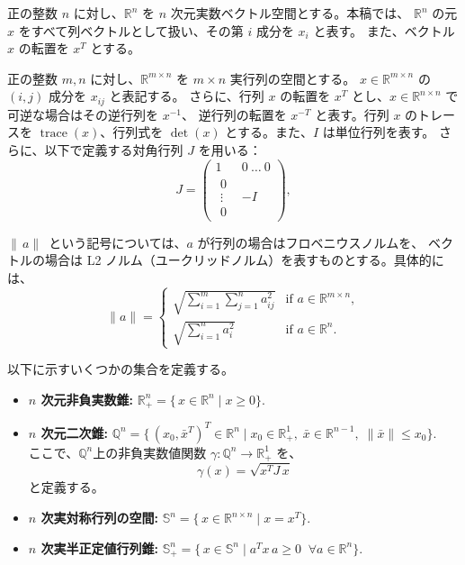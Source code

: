 \documentclass{jsarticle}
\begin{document}
正の整数 $n$ に対し、$\mathbb{R}^n$ を $n$ 次元実数ベクトル空間とする。本稿では、
$\mathbb{R}^n$ の元 $x$ をすべて列ベクトルとして扱い、その第 $i$ 成分を $x_i$ と表す。
また、ベクトル $x$ の転置を $x^T$ とする。

正の整数 $m, n$ に対し、$\mathbb{R}^{m\times n}$ を $m\times n$ 実行列の空間とする。
$x\in\mathbb{R}^{m\times n}$ の $(i,j)$ 成分を $x_{ij}$ と表記する。
さらに、行列 $x$ の転置を $x^T$ とし、$x \in \mathbb{R}^{n\times n}$ で可逆な場合はその逆行列を $x^{-1}$、
逆行列の転置を $x^{-T}$ と表す。行列 $x$ のトレースを $\operatorname{trace}(x)$、行列式を
$\operatorname{det}(x)$ とする。また、$I$ は単位行列を表す。
さらに、以下で定義する対角行列 $J$ を用いる：
\[
    J = \begin{pmatrix}
         1 & 0 ~\ldots ~0 \\
         \substack{\displaystyle 0 \\ \displaystyle \vdots \\ \displaystyle 0} & -I
    \end{pmatrix},
\]

$\|\,a\|\,$ という記号については、$a$ が行列の場合はフロベニウスノルムを、
ベクトルの場合は L2 ノルム（ユークリッドノルム）を表すものとする。具体的には、
\[
\|a\| = 
\begin{cases}
    \sqrt{\sum_{i=1}^m \sum_{j=1}^n a_{ij}^2} & \text{if } a \in \mathbb{R}^{m\times n},\\
    \sqrt{\sum_{i=1}^n a_i^2}               & \text{if } a \in \mathbb{R}^n.
\end{cases}
\]

以下に示すいくつかの集合を定義する。
\begin{itemize}
    \item 
    \textbf{$n$ 次元非負実数錐:} 
    $
      \mathbb{R}^n_+ 
      = \{\,x \in \mathbb{R}^n \mid x \geq 0 \}.
    $

    \item 
    \textbf{$n$ 次元二次錐:}
    $
      \mathbb{Q}^n 
      = \{\, (x_0, \bar{x}^T)^T \in \mathbb{R}^n 
         \mid x_0 \in \mathbb{R}^1_+, \; \bar{x} \in \mathbb{R}^{n-1}, \; \|\bar{x}\| \le x_0 \}.
    $\\
    ここで、$\mathbb{Q}^n$上の非負実数値関数 $\gamma : \mathbb{Q}^n \to \mathbb{R}^1_+$ を、
    \[
      \gamma(x) = \sqrt{x^T J\, x}
    \]
    と定義する。

    \item 
    \textbf{$n$ 次実対称行列の空間:}
    $
      \mathbb{S}^n = \{\, x \in \mathbb{R}^{n\times n} \mid x = x^T \}.
    $

    \item 
    \textbf{$n$ 次実半正定値行列錐:}
    $
      \mathbb{S}^n_+ 
      = \{\, x \in \mathbb{S}^n \mid a^T x\, a \ge 0 \;\; \forall a \in \mathbb{R}^n \}.
    $
\end{itemize}
\end{document}
